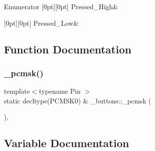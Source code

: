 \begin{DoxyEnumFields}{Enumerator}
[0pt][0pt]{}\hypertarget{namespace__buttons_a36d15e3edce603f30900fff57fad10b2a8282c2db9155da75abb5a4c372acb9e6}{}\label{namespace__buttons_a36d15e3edce603f30900fff57fad10b2a8282c2db9155da75abb5a4c372acb9e6} 
Pressed\+\_\+\+High&\\
\hline

[0pt][0pt]{}\hypertarget{namespace__buttons_a36d15e3edce603f30900fff57fad10b2a3532786b871c50168bb852cd29643393}{}\label{namespace__buttons_a36d15e3edce603f30900fff57fad10b2a3532786b871c50168bb852cd29643393} 
Pressed\+\_\+\+Low&\\
\hline

\end{DoxyEnumFields}


\subsection{Function Documentation}
\hypertarget{namespace__buttons_a0ed7077aa639e3ca9fb1ab787afcb77a}{}\label{namespace__buttons_a0ed7077aa639e3ca9fb1ab787afcb77a} 
\subsubsection{\texorpdfstring{\+\_\+pcmsk()}{\_pcmsk()}}
{\footnotesize\ttfamily template$<$typename Pin $>$ \\
static decltype(P\+C\+M\+S\+K0) \& \+\_\+buttons\+::\+\_\+pcmsk (\begin{DoxyParamCaption}{ }\end{DoxyParamCaption})\hspace{0.3cm}{\ttfamily [inline]}, {\ttfamily [static]}}



\subsection{Variable Documentation}
\hypertarget{namespace__buttons_a6b48336b8f5ba167d870f9d6e6dd2125}{}\label{namespace__buttons_a6b48336b8f5ba167d870f9d6e6dd2125} 
